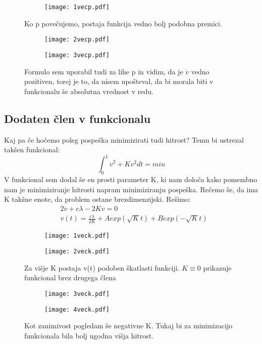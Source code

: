 \documentclass{article}
\begin{document}
\begin{figure}[H]
\centering
\begin{subfigure}{.5\textwidth}
\texttt{[image: 1vecp.pdf]}
\end{subfigure}
\caption*{Ko p povečujemo, postaja funkcija vedno bolj podobna premici.} 
\end{figure}
\begin{figure}[H]
\begin{subfigure}{.5\textwidth}
\texttt{[image: 2vecp.pdf]}
\end{subfigure}
\begin{subfigure}{.5\textwidth}
\texttt{[image: 3vecp.pdf]}
\end{subfigure}
\caption*{Formulo sem uporabil tudi za lihe p in vidim, da je $\dot{v}$ vedno pozitiven, torej je to, da nisem upošteval, da bi morala biti v funkcionalu še absolutna vrednost v redu.}
\end{figure}

\subsection{Dodaten člen v funkcionalu}
Kaj pa če hočemo poleg pospeška minimizirati tudi hitrost? Temu bi ustrezal takšen funkcional:
\begin{equation*}
\int_0^1 \dot{v}^2 + K v^2 dt = min
\end{equation*}
V funkcional sem dodal še en prosti parameter K, ki nam določa kako pomembno nam je minimiziranje hitrosti napram minimiziranju pospeška. Rečemo še, da ima K takšne enote, da problem ostane brezdimenzijski. Rešimo:
\begin{align*}
&2 \ddot{v} + c\lambda - 2Kv = 0 \\
&v(t) = \frac{c \lambda}{2K} + A exp(\sqrt{K}t)+Bexp(-\sqrt{K}t)
\end{align*}
\begin{figure}[H]
\begin{subfigure}{.5\textwidth}
\texttt{[image: 1veck.pdf]}
\end{subfigure}
\begin{subfigure}{.5\textwidth}
\texttt{[image: 2veck.pdf]}
\end{subfigure}
\caption*{Za višje K postaja v(t) podoben škatlasti funkciji. $ K \equiv 0$ prikazuje funkcional brez drugega člena}
\end{figure}

\begin{figure}[H]
\begin{subfigure}{.5\textwidth}
\texttt{[image: 3veck.pdf]}
\end{subfigure}
\begin{subfigure}{.5\textwidth}
\texttt{[image: 4veck.pdf]}
\end{subfigure}
\caption*{Kot zanimivost pogledam še negativne K. Tukaj bi za minimizacijo funkcionala bila bolj ugodna višja hitrost.}
\end{figure}
\end{document}
